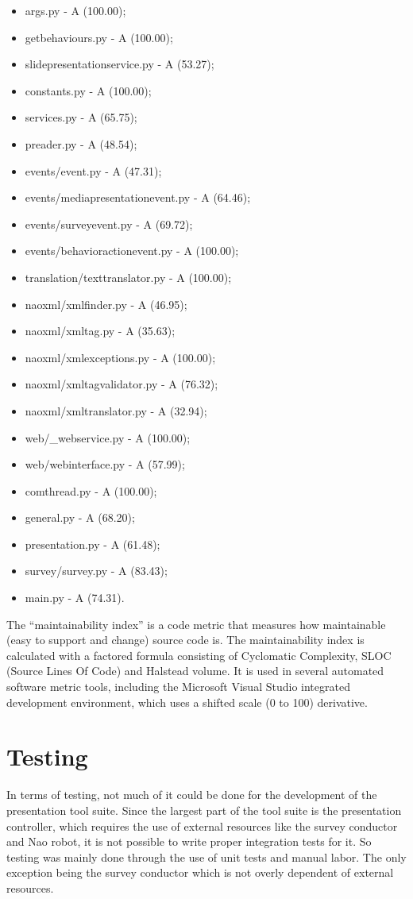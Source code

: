 \documentclass[12pt, fleqn, a4paper]{article}
\begin{document}
\begin{itemize}[noitemsep,topsep=1pt]
	\item args.py - A (100.00);
	\item getbehaviours.py - A (100.00);
	\item slidepresentationservice.py - A (53.27);
	\item constants.py - A (100.00);
	\item services.py - A (65.75);
	\item preader.py - A (48.54);
	\item events/event.py - A (47.31);
	\item events/mediapresentationevent.py - A (64.46);
	\item events/surveyevent.py - A (69.72);
	\item events/behavioractionevent.py - A (100.00);
	\item translation/texttranslator.py - A (100.00);
	\item naoxml/xmlfinder.py - A (46.95);
	\item naoxml/xmltag.py - A (35.63);
	\item naoxml/xmlexceptions.py - A (100.00);
	\item naoxml/xmltagvalidator.py - A (76.32);
	\item naoxml/xmltranslator.py - A (32.94);
	\item web/\_webservice.py - A (100.00);
	\item web/webinterface.py - A (57.99);
	\item comthread.py - A (100.00);
	\item general.py - A (68.20);
	\item presentation.py - A (61.48);
	\item survey/survey.py - A (83.43);
	\item main.py - A (74.31).
\end{itemize}\par
The \enquote{maintainability index} is a code metric that measures how maintainable (easy to support and change) source code is. The maintainability index is calculated with a factored formula consisting of Cyclomatic Complexity, SLOC (Source Lines Of Code) and Halstead volume. It is used in several automated software metric tools, including the Microsoft Visual Studio integrated development environment, which uses a shifted scale (0 to 100) derivative. \citep{metrics}
\section{Testing}
In terms of testing, not much of it could be done for the development of the presentation tool suite. Since the largest part of the tool suite is the presentation controller, which requires the use of external resources like the survey conductor and Nao robot, it is not possible to write proper integration tests for it. So testing was mainly done through the use of unit tests and manual labor. The only exception being the survey conductor which is not overly dependent of external resources.
\end{document}
